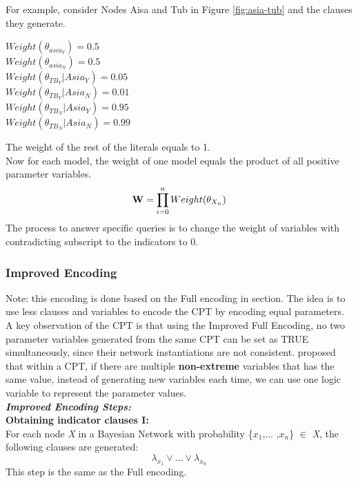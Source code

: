         For example, consider Nodes Aisa and Tub in Figure \ref{fig:asia-tub} and the clauses they generate. 
        \begin{center}
            $Weight(\theta_{asia_{Y}}) = 0.5$\\
            $Weight(\theta_{asia_{N}}) = 0.5$\\
            $Weight(\theta_{TB_{Y}}|Asia_{Y}) = 0.05$\\
            $Weight(\theta_{TB_{Y}}|Asia_{N}) = 0.01$\\
            $Weight(\theta_{TB_{N}}|Asia_{Y}) = 0.95$\\
            $Weight(\theta_{TB_{N}}|Asia_{N}) = 0.99$\\
        \end{center}
        The weight of the rest of the literals equals to 1. \\
        
        \noindent Now for each model, the weight of one model equals the product of all positive parameter variables. 
        $$\textbf{\textbf{W}} = \prod_{i = 0}^{n} Weight(\theta_{X_{n}}) $$
        The process to answer specific queries is to change the weight of variables with contradicting subscript to the indicators to 0.
        
        
        \subsubsection{Improved Encoding}
        Note: this encoding is done based on the Full encoding in section. 
        The idea is to use less clauses and variables to encode the CPT by encoding equal parameters. A key observation of the CPT is that using the Improved Full Encoding, no two parameter variables generated from the same CPT can be set as TRUE simultaneously, since their network instantiations are not consistent. \cite{enc2} proposed that within a CPT, if there are multiple \textbf{non-extreme} variables that has the same value, instead of generating new variables each time, we can use one logic variable to represent the parameter values.\\
        
        \noindent \textbf{\textit{Improved Encoding Steps:}}\\
        \textbf{Obtaining indicator clauses \textsc{I}:}\\
        For each node \textit{X} in a Bayesian Network with probability \{$x_{1}$,... ,$x_{n}$\} $\in$ \textit{X}, the following clauses are generated:
        \begin{equation}\label{Improvedenc_ic}
            \lambda_{x_{1}} \vee ... \vee \lambda_{x_{n}}
        \end{equation}
        This step is the same as the Full encoding.\\

